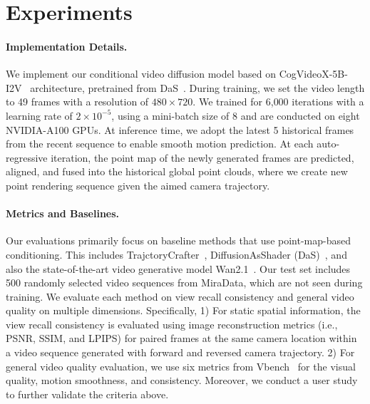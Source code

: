 \section{Experiments}
\label{sec:exp}





% 

\paragraph{Implementation Details.}
We implement our conditional video diffusion model based on CogVideoX-5B-I2V~\cite{yang2024cogvideox} architecture, pretrained from DaS~\cite{gu2025das}. During training, we set the video length to 49 frames with a resolution of $480 \times 720$. We trained for 6{,}000 iterations with a learning rate of $2 \times 10^{-5}$, using a mini-batch size of 8 and are conducted on eight NVIDIA-A100 GPUs.
At inference time, we adopt the latest 5 historical frames from the recent sequence to enable smooth motion prediction. At each auto-regressive iteration, the point map of the newly generated frames are predicted, aligned, and fused into the historical global point clouds, where we create new point rendering sequence given the aimed camera trajectory. 


\paragraph{Metrics and Baselines.}
Our evaluations primarily focus on baseline methods that use point-map-based conditioning. This includes TrajctoryCrafter~\cite{yu2025trajectorycrafter}, DiffusionAsShader (DaS)~\cite{gu2025das}, and also the state-of-the-art video generative model Wan2.1~\cite{wan2025wan}.
Our test set includes 500 randomly selected video sequences from MiraData, which are not seen during training.
We evaluate each method on view recall consistency and general video quality on multiple dimensions. 
Specifically, 
1) For static spatial information, the view recall consistency is evaluated using image reconstruction metrics (i.e., PSNR, SSIM, and LPIPS) for paired frames at the same camera location within a video sequence generated with forward and reversed camera trajectory. 
2) For general video quality evaluation, we use six metrics from Vbench~\cite{huang2024vbench} for the visual quality, motion smoothness, and consistency. 
Moreover, we conduct a user study to further validate the criteria above.

